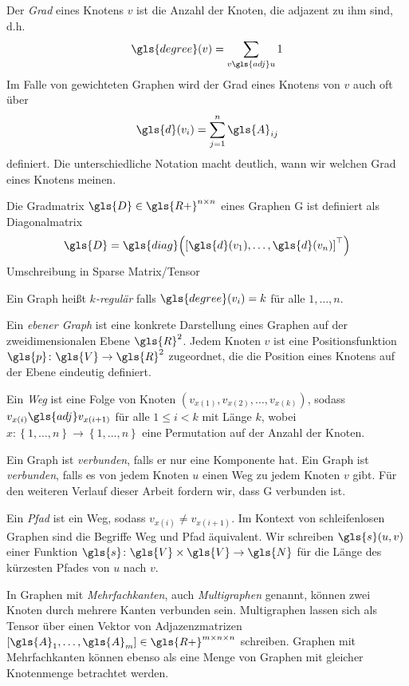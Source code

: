 Der \emph{Grad} eines Knotens $v$ ist die Anzahl der Knoten, die adjazent zu ihm sind, d.h.
\begin{equation}
  \gls{degree}\left(v\right) = \sum_{v \gls{adj} u} 1
\end{equation}
Im Falle von gewichteten Graphen wird der Grad eines Knotens von $v$ auch oft über
\begin{equation}
  \gls{d}\left(v_i\right) = \sum^n_{j=1} \gls{A}_{ij}
\end{equation}
definiert.
Die unterschiedliche Notation macht deutlich, wann wir welchen Grad eines Knotens meinen.

Die Gradmatrix $\gls{D} \in \gls{R+}^{n \times n}$ eines Graphen \gls{G} ist definiert als Diagonalmatrix
\begin{equation}
  \gls{D} = \gls{diag}\left( {\left[ \gls{d}\left(v_1\right), \ldots, \gls{d}\left(v_n\right) \right]}^{\top} \right)
\end{equation}
Umschreibung in Sparse Matrix/Tensor

Ein Graph heißt \emph{$k$-regulär} falls $\gls{degree}\left(v_i\right) = k$ für alle $1, \ldots, n$.

Ein \emph{ebener Graph} ist eine konkrete Darstellung eines Graphen auf der zweidimensionalen Ebene $\gls{R}^2$.
Jedem Knoten $v$ ist eine Positionsfunktion $\gls{p} \colon \gls{V} \to \gls{R}^2$ zugeordnet, die die Position eines Knotens auf der Ebene eindeutig definiert.

Ein \emph{Weg} ist eine Folge von Knoten $\left( v_{x\left(1\right)}, v_{x\left(2\right)}, \ldots, v_{x\left(k\right)} \right)$, sodass $v_{x\left(i\right)} \gls{adj} v_{x\left(i+1\right)}$ für alle $1 \leq i < k$ mit Länge $k$, wobei $x \colon \left\{ 1, \ldots, n \right\} \to \left\{ 1, \ldots, n \right\}$ eine Permutation auf der Anzahl der Knoten.

Ein Graph ist \emph{verbunden}, falls er nur eine Komponente hat.
Ein Graph ist \emph{verbunden}, falls es von jedem Knoten $u$ einen Weg zu jedem Knoten $v$ gibt.
Für den weiteren Verlauf dieser Arbeit fordern wir, dass \gls{G} verbunden ist.\

Ein \emph{Pfad} ist ein Weg, sodass $v_{x\left(i\right)} \neq v_{x\left(i+1\right)}$.
Im Kontext von schleifenlosen Graphen sind die Begriffe Weg und Pfad äquivalent.
Wir schreiben $\gls{s}\left(u, v\right)$ einer Funktion $\gls{s} \colon \gls{V} \times \gls{V} \to \gls{N}$ für die Länge des kürzesten Pfades von $u$ nach $v$.

In Graphen mit \emph{Mehrfachkanten}, auch \emph{Multigraphen} genannt, können zwei Knoten durch mehrere Kanten verbunden sein.
Multigraphen lassen sich als Tensor über einen Vektor von Adjazenzmatrizen $\left[\gls{A}_1, \ldots, \gls{A}_m\right] \in \gls{R+}^{m \times n \times n}$ schreiben.
Graphen mit Mehrfachkanten können ebenso als eine Menge von Graphen mit gleicher Knotenmenge betrachtet werden.
